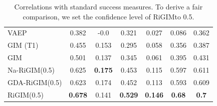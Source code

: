 \documentclass{article}
\newcommand{\sys}{RiGIM}
\newcommand{\system}{\sys\;}
\begin{document}
\begin{table}[htbp]
{\begin{tabular}{lcccccc}
         VAEP & 0.382 & -0.0 & 0.321 & 0.027 & 0.086 & 0.362  \\
         GIM (T1) & 0.455 & 0.153 & 0.295 & 0.058 & 0.356 & 0.387 \\
         GIM & 0.501 & 0.137 & 0.345 & 0.061 & 0.395 & 0.431 \\\hdashline
         Na-\sys({0.5}) & 0.625 & {\bf 0.175} & 0.453 & 0.115 & 0.597 & 0.611 \\
         GDA-\sys({0.5}) & 0.623 & 0.174 & 0.452 & 0.113 & 0.593 & 0.609 \\
         \sys({0.5}) & {\bf 0.678} & 0.141 & {\bf 0.529} & {\bf 0.146} & {\bf 0.68} & {\bf 0.7} \\
         \bottomrule
    \end{tabular}
    }
    \caption{Correlations with standard success measures. To derive a fair comparison, we set the confidence level of \system to 0.5.}
    \vspace{-0.1in}
    \label{table:Correlations}
\end{table}
\end{document}
